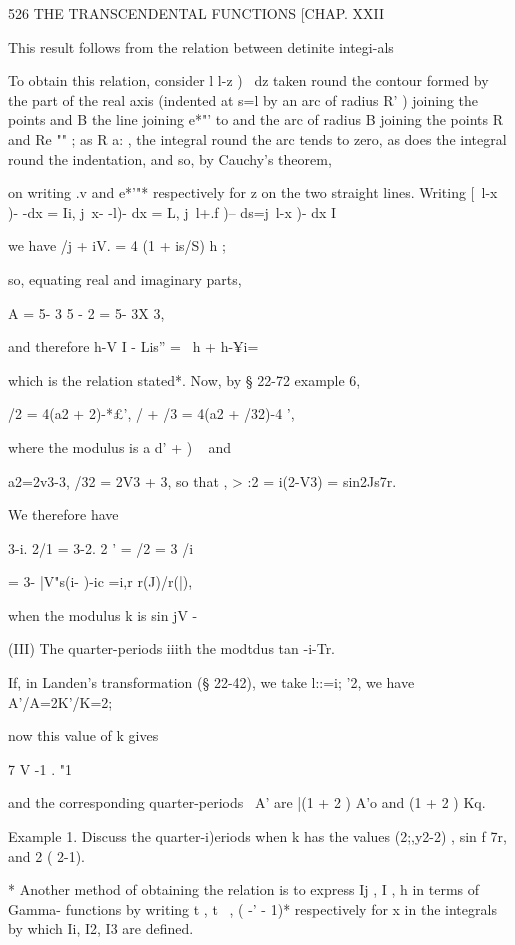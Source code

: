 526 THE TRANSCENDENTAL FUNCTIONS [CHAP. XXII

This result follows from the relation between detinite integi-als

To obtain this relation, consider l l-z )~ dz taken round the contour
formed by the part of the real axis (indented at s=l by an arc of
radius R' ) joining the points and B the line joining e*"' to and the
arc of radius B joining the points R and Re "" ; as R a: , the
integral round the arc tends to zero, as does the integral round the
indentation, and so, by Cauchy's theorem,

on writing .v and e*'"* respectively for z on the two straight lines.
Writing [\ l-x )- -dx = Ii, j\ x- -l)- dx = L, j\ l+.f )-- ds=j\ l-x
)- dx I

we have /j + iV. = 4 (1 + is/S) h ;

so, equating real and imaginary parts,

A = 5- 3 5 - 2 = 5- 3X 3,

and therefore h-V I - Lis'' = \ h + h-¥i=

which is the relation stated*. Now, by § 22-72 example 6,

/2 = 4(a2 + 2)-*£', / + /3 = 4(a2 + /32)-4 ',

where the modulus is a d' + ) ~ and

a2=2v3-3, /32 = 2V3 + 3, so that , > :2 = i(2-V3) = sin2Js7r.

We therefore have

3-i. 2/1 = 3-2. 2 ' = /2 = 3 /i

= 3- |V"s(i- )-ic =i,r r(J)/r(|),

when the modulus k is sin jV -

(III) The quarter-periods iiith the modtdus tan -i-Tr.

If, in Landen's transformation (§ 22-42), we take l::=i; '2, we have
A'/A=2K'/K=2;



now this value of k gives



7 V -1 . "1



and the corresponding quarter-periods \, A' are |(1 + 2 ) A'o and (1 +
2 ) Kq.

Example 1. Discuss the quarter-i)eriods when k has the values
(2;,y2-2) , sin f 7r, and 2 ( 2-1).

* Another method of obtaining the relation is to express Ij , I , h in
terms of Gamma- functions by writing t , t~ , ( -' - 1)* respectively
for x in the integrals by which Ii, I2, I3 are defined.



